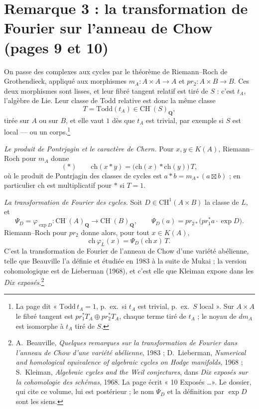 \documentclass[11pt,a4paper]{article}
\begin{document}
\section*{Remarque 3 : la transformation de Fourier sur l'anneau de Chow (pages 9 et 10)}

On passe des complexes aux cycles par le théorème de Riemann--Roch de
Grothendieck, appliqué aux morphismes $m_A \colon A \times A \to A$ et
$pr_2 \colon A \times B \to B$. Ces deux morphismes sont lisses, et leur
fibré tangent relatif est tiré de $S$ : c'est $t_A$, l'algèbre de Lie. Leur
classe de Todd relative est donc la même classe
\[
  T = \mathrm{Todd}(t_A) \in \mathrm{CH}^{\cdot}(S)_{\mathbf{Q}},
\]
tirée sur $A$ ou sur $B$, et elle vaut $1$ dès que $t_A$ est trivial, par
exemple si $S$ est local — ou un corps.\footnote{La page dit « $\mathrm{Todd}
\,t_A = 1$, p.\ ex.\ si $t_A$ est trivial, p.\ ex.\ $S$ local ». Sur $A \times
A$ le fibré tangent est $pr_1^{*}T_A \oplus pr_2^{*}T_A$, chaque terme tiré de
$t_A$ ; le noyau de $dm_A$ est isomorphe à $t_A$ tiré de $S$.}

\emph{Le produit de Pontrjagin et le caractère de Chern.} Pour $x, y \in
K(A)$, Riemann--Roch pour $m_A$ donne
\[
  (*) \qquad \mathrm{ch}(x * y) = \bigl(\mathrm{ch}(x) * \mathrm{ch}(y)\bigr)\,T,
\]
où le produit de Pontrjagin des classes de cycles est $a * b = m_{A*}(a
\boxtimes b)$ ; en particulier $\mathrm{ch}$ est multiplicatif pour $*$ si
$T = 1$.

\emph{La transformation de Fourier des cycles.} Soit $D \in \mathrm{CH}^{1}(A
\times B)$ la classe de $L$, et
\[
  \Psi_D = \varphi_{\exp D} \colon
  \mathrm{CH}^{\cdot}(A)_{\mathbf{Q}} \longrightarrow \mathrm{CH}^{\cdot}(B)_{\mathbf{Q}},
  \qquad
  \Psi_D(a) = pr_{2*}\bigl(pr_1^{*}a \cdot \exp D\bigr).
\]
Riemann--Roch pour $pr_2$ donne alors, pour tout $x \in K(A)$,
\[
  \mathrm{ch}\,\varphi_L(x) = \Psi_D(\mathrm{ch}\,x)\,T .
\]
C'est la transformation de Fourier de l'anneau de Chow d'une variété
abélienne, telle que Beauville l'a définie et étudiée en 1983 à la suite de
Mukai ; la version cohomologique est de Lieberman (1968), et c'est elle que
Kleiman expose dans les \emph{Dix exposés}.\footnote{A.~Beauville,
\emph{Quelques remarques sur la transformation de Fourier dans l'anneau de
Chow d'une variété abélienne}, 1983 ; D.~Lieberman, \emph{Numerical and
homological equivalence of algebraic cycles on Hodge manifolds}, 1968 ;
S.~Kleiman, \emph{Algebraic cycles and the Weil conjectures}, dans \emph{Dix
exposés sur la cohomologie des schémas}, 1968. La page écrit « 10 Exposés
\ldots ». Le dossier, qui cite ce volume, lui est postérieur ; le nom
$\Psi_D$ et la définition par $\exp D$ sont les siens.}
\end{document}
